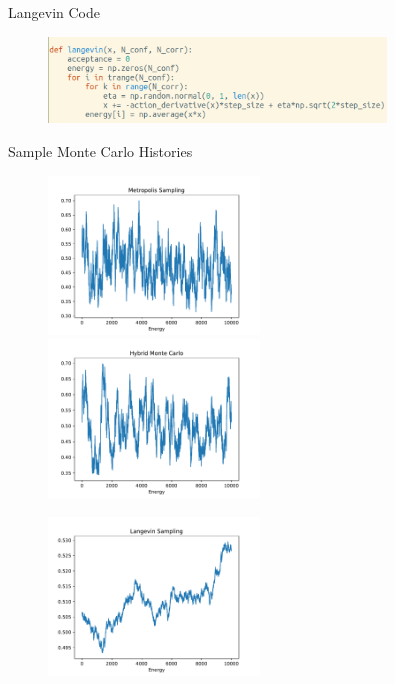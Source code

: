\documentclass[10pt]{beamer}
\begin{document}
\begin{frame}{Langevin Code}
    \begin{figure}
        \includegraphics[width=0.8\textwidth]{langevin_code.png}
    \end{figure}
\end{frame}

\begin{frame}{Sample Monte Carlo Histories}
    \begin{figure}
        \includegraphics[width=0.5\textwidth]{metropolis.pdf}
        \includegraphics[width=0.5\textwidth]{hmc.pdf}
    \end{figure}
    \vspace{-0.5cm}
    \begin{figure}
        \includegraphics[width=0.5\textwidth]{langevin.pdf}
    \end{figure}
\end{frame}
\end{document}
